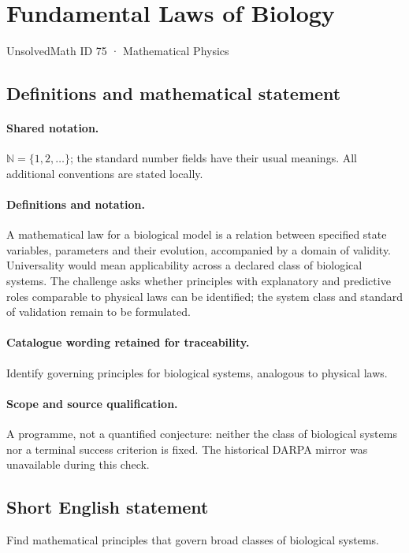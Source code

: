 \documentclass[11pt]{article}
\begin{document}
\setcounter{section}{74}
\section{Fundamental Laws of Biology}\label{75}
{\small UnsolvedMath ID 75 · Mathematical Physics}
\subsection{Definitions and mathematical statement}

\paragraph{Shared notation.}$\mathbb N=\{1,2,\ldots\}$; the standard number fields have their usual meanings. All additional conventions are stated locally.


\paragraph{Definitions and notation.}A mathematical law for a biological model is a relation between specified state variables, parameters and their evolution, accompanied by a domain of validity. Universality would mean applicability across a declared class of biological systems. The challenge asks whether principles with explanatory and predictive roles comparable to physical laws can be identified; the system class and standard of validation remain to be formulated.

\paragraph{Catalogue wording retained for traceability.}
Identify governing principles for biological systems, analogous to physical laws.
\paragraph{Scope and source qualification.}A programme, not a quantified conjecture: neither the class of biological systems nor a terminal success criterion is fixed. The historical DARPA mirror was unavailable during this check.
\subsection{Short English statement}
Find mathematical principles that govern broad classes of biological systems.
\end{document}
